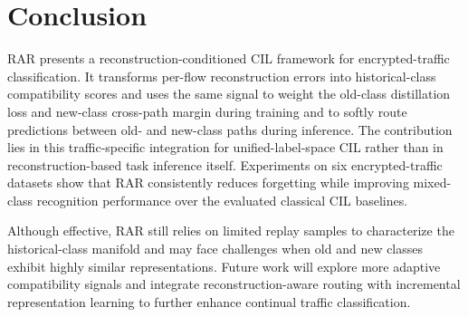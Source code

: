 %
%
%

\section{Conclusion}\label{sec:conclusion}

RAR presents a reconstruction-conditioned CIL framework for encrypted-traffic classification. It transforms per-flow reconstruction errors into historical-class compatibility scores and uses the same signal to weight the old-class distillation loss and new-class cross-path margin during training and to softly route predictions between old- and new-class paths during inference. The contribution lies in this traffic-specific integration for unified-label-space CIL rather than in reconstruction-based task inference itself. Experiments on six encrypted-traffic datasets show that RAR consistently reduces forgetting while improving mixed-class recognition performance over the evaluated classical CIL baselines.

Although effective, RAR still relies on limited replay samples to characterize the historical-class manifold and may face challenges when old and new classes exhibit highly similar representations. Future work will explore more adaptive compatibility signals and integrate reconstruction-aware routing with incremental representation learning to further enhance continual traffic classification.
